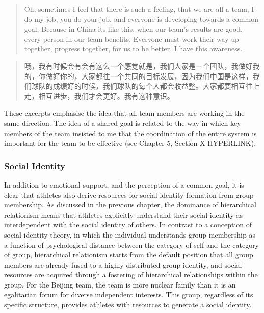 \begin{CJK}{UTF8}{gbsn}
    \begin{quotation}
        Oh, sometimes I feel that there is such a feeling, that we are all a team, I do my job, you do your job, and everyone is developing towards a common goal.  Because in China its like this, when our team’s results are good, every person in our team benefits.  Everyone must work their way up together, progress together, for us to be better. I have this awareness.
    \end{quotation}

  \begin{quotation}
      	哦，我有时候会有会有这么一个感觉就是，我们大家是一个团队，我做好我的，你做好你的，大家都往一个共同的目标发展，因为我们中国是这样，我们球队的成绩好的时候，我们球队的每个人都会收益整。大家都要相互往上走，相互进步，我们才会更好。我有这种意识。 
  \end{quotation}

These excerpts emphasise the idea that all team members are working in the same direction. The idea of a shared goal is related to the way in which key members of the team insisted to me that the coordination of the entire system is important for the team to be effective (see Chapter 5, Section X HYPERLINK).




\subsubsection{Social Identity}

In addition to emotional support, and the perception of a common goal, it is clear that athletes also derive resources for social identity formation from group membership.    As discussed in the previous chapter, the dominance of hierarchical relationism means that athletes explicitly understand their social identity as interdependent with the social identity of others.  In contrast to a conception of social identity theory, in which the individual understands group membership as a function of psychological distance between the category of self and the category of group, hierarchical relationism starts from the default position that all group members are already fused to a highly distributed group identity, and social resources are acquired through a fostering of hierarchical relationships within the group.  For the Beijing team, the team is more nuclear family than it is an egalitarian forum for diverse independent interests.  This group, regardless of its specific structure, provides athletes with resources to generate a social identity.


\end{CJK}
